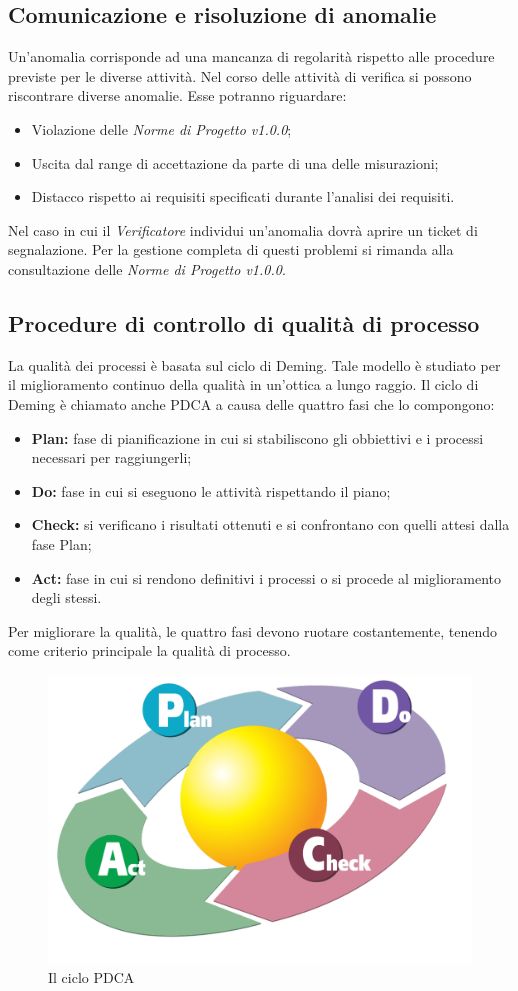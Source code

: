 \subsection{Comunicazione e risoluzione di anomalie}
Un'anomalia corrisponde ad una mancanza di regolarità rispetto alle procedure previste per le diverse attività. Nel corso delle attività di verifica si possono riscontrare diverse anomalie. Esse potranno riguardare:
\begin{itemize}
	\item Violazione delle \textit{Norme di Progetto v1.0.0};
	\item Uscita dal range di accettazione da parte di una delle misurazioni;
	\item Distacco rispetto ai requisiti specificati durante l'analisi dei requisiti.
\end{itemize}
Nel caso in cui il \textit{Verificatore} individui un'anomalia dovrà aprire un ticket di segnalazione. Per la gestione completa di questi problemi si rimanda alla consultazione delle \textit{Norme di Progetto v1.0.0}.

\subsection{Procedure di controllo di qualità di processo}
La qualità dei processi è basata sul ciclo di Deming. Tale modello è studiato per il miglioramento continuo della qualità in un'ottica a lungo raggio.
Il ciclo di Deming è chiamato anche PDCA a causa delle quattro fasi che lo compongono:
\begin{itemize}
	\item \textbf{Plan:} fase di pianificazione in cui si stabiliscono gli obbiettivi e i processi necessari per raggiungerli;
	\item \textbf{Do:} fase in cui si eseguono le attività rispettando il piano;
	\item \textbf{Check:} si verificano i risultati ottenuti e si confrontano con quelli attesi dalla fase Plan;
	\item \textbf{Act:} fase in cui si rendono definitivi i processi o si procede al miglioramento degli stessi. 
\end{itemize}
Per migliorare la qualità, le quattro fasi devono ruotare costantemente, tenendo come criterio principale la qualità di processo.
\begin{figure}[h]
\centering
\includegraphics[width=0.7\linewidth]{img/PDCA_Cycle}
\caption[Il ciclo PDCA]{Il ciclo PDCA}
\label{fig:PDCA_Cycle}
\end{figure}

